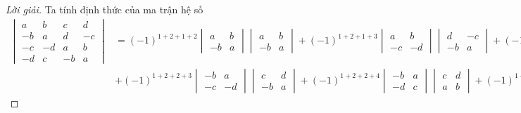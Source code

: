 \documentclass[class=linear-algebra,crop=false]{standalone}
\begin{document}
\begin{proof}[Lời giải]
	\par Ta tính định thức của ma trận hệ số
	\begingroup{}
	\allowdisplaybreaks{}
	\begin{align*}
		\begin{vmatrix}
			a  & b  & c  & d  \\
			-b & a  & d  & -c \\
			-c & -d & a  & b  \\
			-d & c  & -b & a
		\end{vmatrix}
		 & = {(-1)}^{1+2+1+2}
		\begin{vmatrix}
			a  & b \\
			-b & a
		\end{vmatrix}
		\begin{vmatrix}
			a  & b \\
			-b & a
		\end{vmatrix}
		+ {(-1)}^{1+2+1+3}
		\begin{vmatrix}
			a  & b  \\
			-c & -d
		\end{vmatrix}
		\begin{vmatrix}
			d  & -c \\
			-b & a
		\end{vmatrix}
		+ {(-1)}^{1+2+1+4}
		\begin{vmatrix}
			a  & b \\
			-d & c
		\end{vmatrix}
		\begin{vmatrix}
			d & -c \\
			a & b
		\end{vmatrix}                                                                                                 \\
		 & + {(-1)}^{1+2+2+3}
		\begin{vmatrix}
			-b & a  \\
			-c & -d
		\end{vmatrix}
		\begin{vmatrix}
			c  & d \\
			-b & a
		\end{vmatrix}
		+ {(-1)}^{1+2+2+4}
		\begin{vmatrix}
			-b & a \\
			-d & c
		\end{vmatrix}
		\begin{vmatrix}
			c & d \\
			a & b
		\end{vmatrix}
		+ {(-1)}^{1+2+3+4}

\end{align*}
\end{proof}
\end{document}
